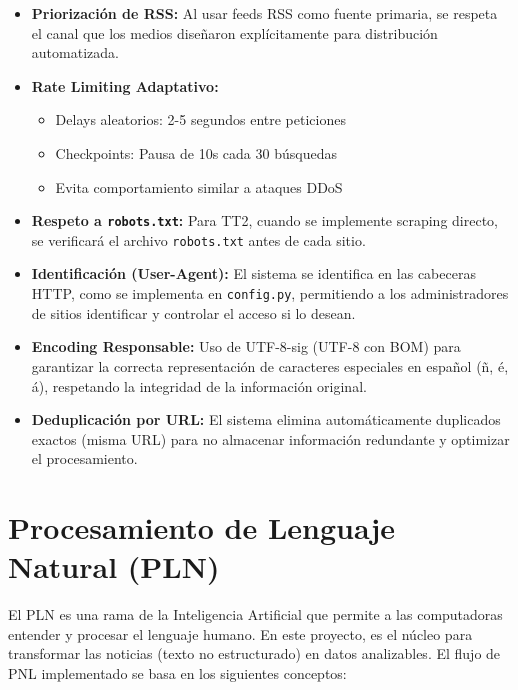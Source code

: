 \begin{itemize}
    \item \textbf{Priorización de RSS:} Al usar feeds RSS como fuente primaria, se respeta el canal que los medios diseñaron explícitamente para distribución automatizada.
    
    \item \textbf{Rate Limiting Adaptativo:} 
    \begin{itemize}
        \item Delays aleatorios: 2-5 segundos entre peticiones
        \item Checkpoints: Pausa de 10s cada 30 búsquedas
        \item Evita comportamiento similar a ataques DDoS
    \end{itemize}
    
    \item \textbf{Respeto a \texttt{robots.txt}:} Para TT2, cuando se implemente scraping directo, se verificará el archivo \texttt{robots.txt} antes de cada sitio.
    
    \item \textbf{Identificación (User-Agent):} El sistema se identifica en las cabeceras HTTP, como se implementa en \texttt{config.py}, permitiendo a los administradores de sitios identificar y controlar el acceso si lo desean.
    
    \item \textbf{Encoding Responsable:} Uso de UTF-8-sig (UTF-8 con BOM) para garantizar la correcta representación de caracteres especiales en español (ñ, é, á), respetando la integridad de la información original.
    
    \item \textbf{Deduplicación por URL:} El sistema elimina automáticamente duplicados exactos (misma URL) para no almacenar información redundante y optimizar el procesamiento.
\end{itemize}

\section{Procesamiento de Lenguaje Natural (PLN)}
\label{sec:pln}

El PLN es una rama de la Inteligencia Artificial que permite a las computadoras entender y procesar el lenguaje humano. En este proyecto, es el núcleo para transformar las noticias (texto no estructurado) en datos analizables. El flujo de PNL implementado se basa en los siguientes conceptos:


